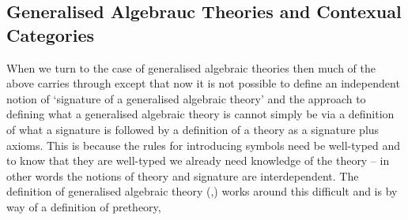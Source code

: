 \subsection{Generalised Algebrauc Theories 	and Contexual Categories}
\note
When we turn to the case of generalised algebraic theories then much of the above carries through except that now 
it is not possible to define an independent notion of `signature of a generalised algebraic theory' and
the approach to defining what a generalised algebraic theory is cannot simply be via a definition of what a signature is followed by a definition 
of a theory  as a signature plus axioms. This is because the rules for introducing symbols need be well-typed and to know that
they are well-typed we already need knowledge of the theory -- in other words the notions of theory and signature are interdependent. 
The  definition of generalised algebraic theory (\cite{Cartmell78},\cite{Cartmell86})  works around this difficult and is by way of 
a definition of pretheory, 
